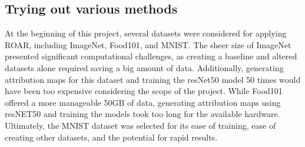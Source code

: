 \documentclass[conference]{IEEEtran}
\begin{document}
\subsection{Trying out various methods}

At the beginning of this project, several datasets were considered for applying ROAR, including ImageNet, Food101, and MNIST. The sheer size of ImageNet\cite{4_ImageNet} presented significant computational challenges, as creating a baseline and altered datasets alone required saving a big amount of data. Additionally, generating attribution maps for this dataset and training the resNet50 \cite{5_ResNet50} model 50 times would have been too expensive considering the scope of the project.
While Food101\cite{6_Food101} offered a more manageable 50GB of data, generating attribution maps using resNET50 and training the models took too long for the available hardware. Ultimately, the MNIST dataset\cite{7_MNIST} was selected for its ease of training, ease of creating other datasets, and the potential for rapid results.
\end{document}
